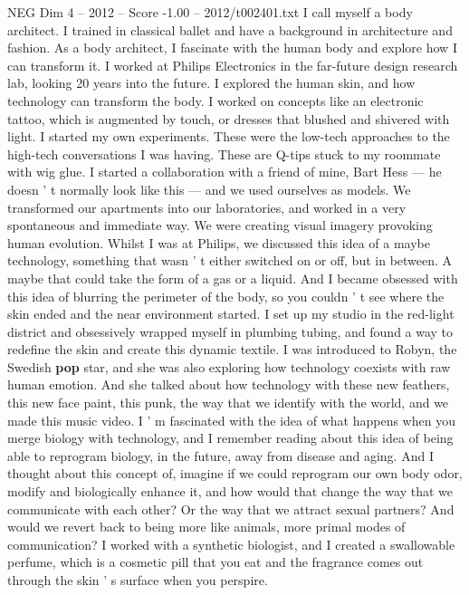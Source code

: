 \begin{textsample}{NEG Dim 4 – 2012 – Score -1.00 – 2012/t002401.txt}  \label{ex:f4_neg_011}
I call myself a body architect.
I trained in classical ballet and have a background in architecture and fashion.
As a body architect, I fascinate with the human body and explore how I can transform it.
I worked at Philips Electronics in the far-future design research lab, looking 20 years into the future.
I explored the human skin, and how technology can transform the body.
I worked on concepts like an electronic tattoo, which is augmented by touch, or dresses that blushed and shivered with light.
I started my own experiments.
These were the low-tech approaches to the high-tech conversations I was having.
These are Q-tips stuck to my roommate with wig glue.
I started a collaboration with a friend of mine, Bart Hess — he doesn ' t normally look like this — and we used ourselves as models.
We transformed our apartments into our laboratories, and worked in a very spontaneous and immediate way.
We were creating visual imagery provoking human evolution.
Whilst I was at Philips, we discussed this idea of a maybe technology, something that wasn ' t either switched on or off, but in between.
A maybe that could take the form of a gas or a liquid.
And I became obsessed with this idea of blurring the perimeter of the body, so you couldn ' t see where the skin ended and the near environment started.
I set up my studio in the red-light district and obsessively wrapped myself in plumbing tubing, and found a way to redefine the skin and create this dynamic textile.
I was introduced to Robyn, the Swedish \textbf{pop} star, and she was also exploring how technology coexists with raw human emotion.
And she talked about how technology with these new feathers, this new face paint, this punk, the way that we identify with the world, and we made this music video.
I ' m fascinated with the idea of what happens when you merge biology with technology, and I remember reading about this idea of being able to reprogram biology, in the future, away from disease and aging.
And I thought about this concept of, imagine if we could reprogram our own body odor, modify and biologically enhance it, and how would that change the way that we communicate with each other?
Or the way that we attract sexual partners?
And would we revert back to being more like animals, more primal modes of communication?
I worked with a synthetic biologist, and I created a swallowable perfume, which is a cosmetic pill that you eat and the fragrance comes out through the skin ' s surface when you perspire.

\end{textsample}
